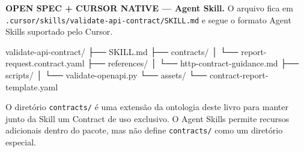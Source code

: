 \documentclass[
  10pt,
  a4paper,
  oneside]{book}
\newenvironment{Shaded}{}{}
\newcommand{\NormalTok}[1]{#1}
\renewenvironment{Shaded}{\begin{snugshade}}{\end{snugshade}}%
\begin{document}
\textbf{OPEN SPEC + CURSOR NATIVE --- Agent Skill.} O arquivo fica em
\texttt{.cursor/skills/validate-api-contract/SKILL.md} e segue o formato
Agent Skills suportado pelo Cursor.

\begin{Shaded}
\begin{Highlighting}[]
\NormalTok{validate{-}api{-}contract/}
\NormalTok{├── SKILL.md}
\NormalTok{├── contracts/}
\NormalTok{│   └── report{-}request.contract.yaml}
\NormalTok{├── references/}
\NormalTok{│   └── http{-}contract{-}guidance.md}
\NormalTok{├── scripts/}
\NormalTok{│   └── validate{-}openapi.py}
\NormalTok{└── assets/}
\NormalTok{    └── contract{-}report{-}template.yaml}
\end{Highlighting}
\end{Shaded}

O diretório \texttt{contracts/} é uma extensão da ontologia deste livro
para manter junto da Skill um Contract de uso exclusivo. O Agent Skills
permite recursos adicionais dentro do pacote, mas não define
\texttt{contracts/} como um diretório especial.
\end{document}
